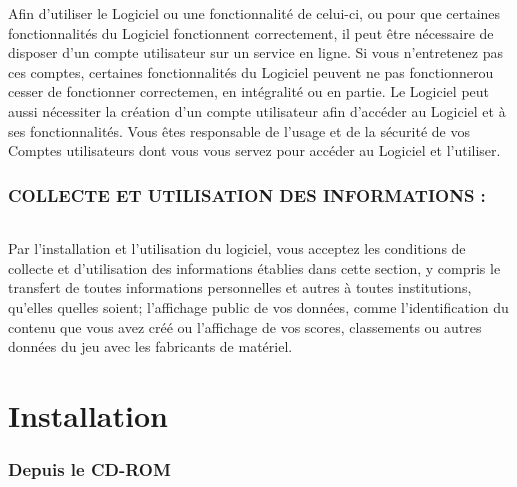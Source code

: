\documentclass[titlepage, 13px, a4paper]{report}
\begin{document}
Afin d'utiliser le Logiciel ou une fonctionnalité de celui-ci, ou pour que
certaines fonctionnalités du Logiciel fonctionnent correctement, il peut être
nécessaire de disposer d'un compte utilisateur sur un service en ligne. Si vous
n'entretenez pas ces comptes, certaines fonctionnalités du Logiciel peuvent ne
pas fonctionnerou cesser de fonctionner correctemen, en intégralité ou en
partie. Le Logiciel peut aussi nécessiter la création d'un compte utilisateur
afin d'accéder au Logiciel et à ses fonctionnalités. Vous êtes responsable de
l'usage et de la sécurité de vos Comptes utilisateurs dont vous vous servez
pour accéder au Logiciel et l'utiliser. \\


\section*{COLLECTE ET UTILISATION DES INFORMATIONS :}
\paragraph*{} \hspace{0pt}
Par l'installation et l'utilisation du logiciel, vous acceptez les conditions
de collecte et d'utilisation des informations établies dans cette section, y
compris le transfert de toutes informations personnelles et autres à toutes
institutions, qu'elles quelles soient; l'affichage public de vos données, comme
l'identification du contenu que vous avez créé ou l'affichage de vos scores,
classements ou autres données du jeu avec les fabricants de matériel. \\


\newpage


\part{Installation} 

\section{Depuis le CD-ROM}
\end{document}
